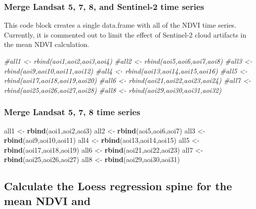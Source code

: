 \documentclass[
]{article}
\newenvironment{Shaded}{\begin{snugshade}}{\end{snugshade}}
\newcommand{\CommentTok}[1]{\textcolor[rgb]{0.56,0.35,0.01}{\textit{#1}}}
\newcommand{\KeywordTok}[1]{\textcolor[rgb]{0.13,0.29,0.53}{\textbf{#1}}}
\newcommand{\NormalTok}[1]{#1}
\newcommand{\StringTok}[1]{\textcolor[rgb]{0.31,0.60,0.02}{#1}}
\begin{document}
\hypertarget{merge-landsat-5-7-8-and-sentinel-2-time-series}{%
\subsubsection{Merge Landsat 5, 7, 8, and Sentinel-2 time
series}\label{merge-landsat-5-7-8-and-sentinel-2-time-series}}

This code block creates a single data.frame with all of the NDVI time
series. Currently, it is commented out to limit the effect of Sentinel-2
cloud artifacts in the mean NDVI calculation.

\begin{Shaded}
\begin{Highlighting}[]
\CommentTok{#all1 <- rbind(aoi1,aoi2,aoi3,aoi4)}
\CommentTok{#all2 <- rbind(aoi5,aoi6,aoi7,aoi8)}
\CommentTok{#all3 <- rbind(aoi9,aoi10,aoi11,aoi12)}
\CommentTok{#all4 <- rbind(aoi13,aoi14,aoi15,aoi16)}
\CommentTok{#all5 <- rbind(aoi17,aoi18,aoi19,aoi20)}
\CommentTok{#all6 <- rbind(aoi21,aoi22,aoi23,aoi24)}
\CommentTok{#all7 <- rbind(aoi25,aoi26,aoi27,aoi28)}
\CommentTok{#all8 <- rbind(aoi29,aoi30,aoi31,aoi32)}
\end{Highlighting}
\end{Shaded}

\hypertarget{merge-landsat-5-7-8-time-series}{%
\subsubsection{Merge Landsat 5, 7, 8 time
series}\label{merge-landsat-5-7-8-time-series}}

\begin{Shaded}
\begin{Highlighting}[]
\NormalTok{all1 <-}\StringTok{ }\KeywordTok{rbind}\NormalTok{(aoi1,aoi2,aoi3)}
\NormalTok{all2 <-}\StringTok{ }\KeywordTok{rbind}\NormalTok{(aoi5,aoi6,aoi7)}
\NormalTok{all3 <-}\StringTok{ }\KeywordTok{rbind}\NormalTok{(aoi9,aoi10,aoi11)}
\NormalTok{all4 <-}\StringTok{ }\KeywordTok{rbind}\NormalTok{(aoi13,aoi14,aoi15)}
\NormalTok{all5 <-}\StringTok{ }\KeywordTok{rbind}\NormalTok{(aoi17,aoi18,aoi19)}
\NormalTok{all6 <-}\StringTok{ }\KeywordTok{rbind}\NormalTok{(aoi21,aoi22,aoi23)}
\NormalTok{all7 <-}\StringTok{ }\KeywordTok{rbind}\NormalTok{(aoi25,aoi26,aoi27)}
\NormalTok{all8 <-}\StringTok{ }\KeywordTok{rbind}\NormalTok{(aoi29,aoi30,aoi31)}
\end{Highlighting}
\end{Shaded}

\hypertarget{calculate-the-loess-regression-spine-for-the-mean-ndvi-and}{%
\subsection{Calculate the Loess regression spine for the mean NDVI
and}\label{calculate-the-loess-regression-spine-for-the-mean-ndvi-and}}
\end{document}
